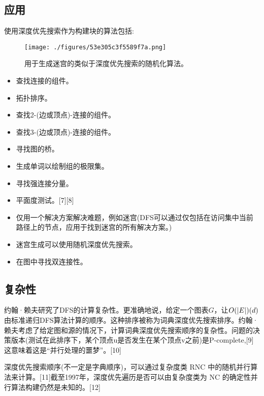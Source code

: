 \subsection{应用}
使用深度优先搜索作为构建块的算法包括:
\begin{figure}[ht]
\centering
\texttt{[image: ./figures/53e305c3f5589f7a.png]}
\caption{用于生成迷宫的类似于深度优先搜索的随机化算法。} \label{fig_SDYXSS_4}
\end{figure}
\begin{itemize}
\item 查找连接的组件。
\item 拓扑排序。
\item 查找2-(边或顶点)-连接的组件。
\item 查找3-(边或顶点)-连接的组件。
\item 寻找图的桥。
\item 生成单词以绘制组的极限集。
\item 寻找强连接分量。
\item 平面度测试。[7][8]
\item 仅用一个解决方案解决难题，例如迷宫(DFS可以通过仅包括在访问集中当前路径上的节点，应用于找到迷宫的所有解决方案。)
\item 迷宫生成可以使用随机深度优先搜索。
\item 在图中寻找双连接性。
\end{itemize}

\subsection{复杂性}
约翰·赖夫研究了DFS的计算复杂性。更准确地说，给定一个图表$G$，让$O(|E|) \\ (d)$ 由标准递归DFS算法计算的顺序。这种排序被称为词典深度优先搜索排序。约翰·赖夫考虑了给定图和源的情况下，计算词典深度优先搜索顺序的复杂性。问题的决策版本(测试在此排序下，某个顶点u是否发生在某个顶点v之前)是P-complete,[9]这意味着这是“并行处理的噩梦”。[10]

深度优先搜索顺序(不一定是字典顺序)，可以通过复杂度类 RNC 中的随机并行算法来计算。[11]截至1997年，深度优先遍历是否可以由复杂度类为 NC 的确定性并行算法构建仍然是未知的。[12]
